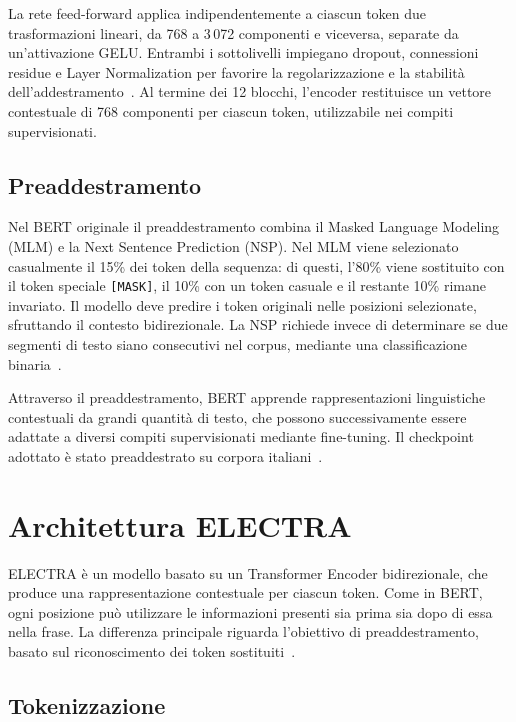 \documentclass[12pt,a4paper]{report}
\begin{document}
La rete feed-forward applica indipendentemente a ciascun token due trasformazioni lineari, da 768 a 3\,072 componenti e viceversa, separate da un'attivazione GELU. Entrambi i sottolivelli impiegano dropout, connessioni residue e Layer Normalization per favorire la regolarizzazione e la stabilità dell'addestramento~\cite{devlin2019,vaswani2017}. Al termine dei 12 blocchi, l'encoder restituisce un vettore contestuale di 768 componenti per ciascun token, utilizzabile nei compiti supervisionati.

\subsection{Preaddestramento}
\label{subsec:pretraining}

Nel BERT originale il preaddestramento combina il Masked Language Modeling (MLM) e la Next Sentence Prediction (NSP). Nel MLM viene selezionato casualmente il 15\% dei token della sequenza: di questi, l'80\% viene sostituito con il token speciale \texttt{[MASK]}, il 10\% con un token casuale e il restante 10\% rimane invariato. Il modello deve predire i token originali nelle posizioni selezionate, sfruttando il contesto bidirezionale. La NSP richiede invece di determinare se due segmenti di testo siano consecutivi nel corpus, mediante una classificazione binaria~\cite{devlin2019}.

Attraverso il preaddestramento, BERT apprende rappresentazioni linguistiche contestuali da grandi quantità di testo, che possono successivamente essere adattate a diversi compiti supervisionati mediante fine-tuning. Il checkpoint adottato è stato preaddestrato su corpora italiani~\cite{bertxxl}.

\section{Architettura ELECTRA}
\label{sec:electra-architecture}

ELECTRA è un modello basato su un Transformer Encoder bidirezionale, che produce una rappresentazione contestuale per ciascun token. Come in BERT, ogni posizione può utilizzare le informazioni presenti sia prima sia dopo di essa nella frase. La differenza principale riguarda l'obiettivo di preaddestramento, basato sul riconoscimento dei token sostituiti~\cite{electra2020}.

\subsection{Tokenizzazione}
\label{subsec:electra-tokenization}
\end{document}
